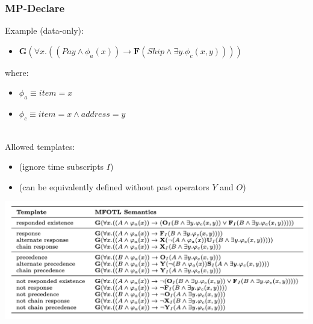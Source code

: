 \documentclass[xcolor=dvipsnames]{beamer}
\newcommand{\always}{\mathbf{G}\xspace}
\newcommand{\eventually}{\mathbf{F}\xspace}
\begin{document}
\begin{frame}
\frametitle{MP-Declare}
Example (data-only):

\begin{itemize}
	\item $\always(\forall x.((Pay\land\phi_a(x)) \rightarrow \eventually (Ship \land\exists y.\phi_c(x, y))))$
\end{itemize}

where:
\begin{itemize}
	\item $\phi_a\equiv item=x$ 
	\item $\phi_c\equiv item= x \land address=y$ 
\end{itemize}

~\\

Allowed templates:
\begin{scriptsize}
\begin{itemize}
	\item (ignore time subscripts $I$)
	\item (can be equivalently defined without past operators $Y$ and $O$)
\end{itemize}
\end{scriptsize}

\begin{center}
\includegraphics[scale=.3]{figures/mp-declare}
\end{center}



\end{frame}

\end{document}
